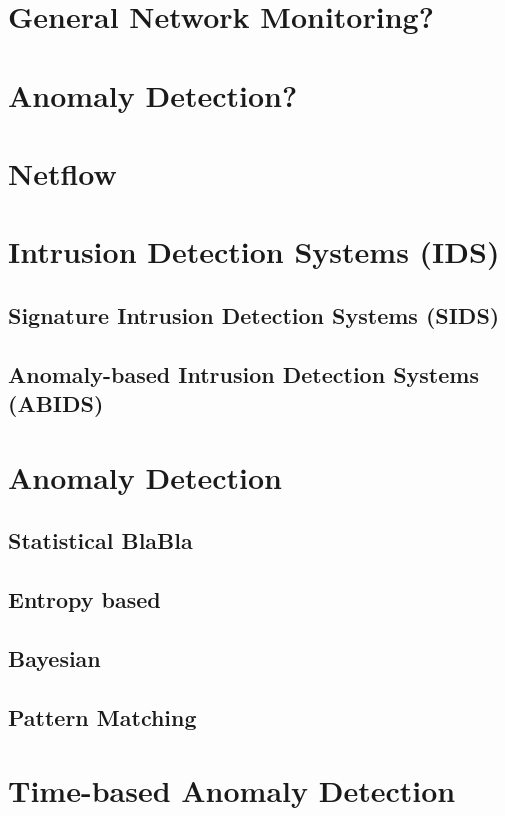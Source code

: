 
\section{General Network Monitoring?}

\section{Anomaly Detection?}

\section{Netflow}

\section{Intrusion Detection Systems (IDS)}
\subsection{Signature Intrusion Detection Systems (SIDS)}
\subsection{Anomaly-based Intrusion Detection Systems (ABIDS)}

\section{Anomaly Detection}
\subsection{Statistical BlaBla}
\subsection{Entropy based}
\subsection{Bayesian}
\subsection{Pattern Matching}

\section{Time-based Anomaly Detection}

